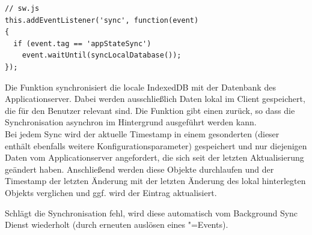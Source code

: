\begin{lstlisting}[caption={\code{sync}"=EventListener in der Service Worker Konfigurationsdatei},label={lst_realisierung_sw-background-sync}, frame=single]
// sw.js
this.addEventListener('sync', function(event) 
{
  if (event.tag == 'appStateSync') 
    event.waitUntil(syncLocalDatabase());
});
\end{lstlisting}

Die Funktion  synchronisiert die locale IndexedDB mit der Datenbank des Applicationserver. Dabei werden ausschließlich Daten lokal im Client gespeichert, die für den Benutzer relevant sind. Die Funktion gibt einen  zurück, so dass die Synchronisation asynchron im Hintergrund ausgeführt werden kann. \\
Bei jedem Sync wird der aktuelle Timestamp in einem gesonderten  (dieser enthält ebenfalls weitere Konfigurationsparameter) gespeichert und nur diejenigen Daten vom Applicationserver angefordert, die sich seit der letzten Aktualisierung geändert haben. Anschließend werden diese Objekte durchlaufen und der Timestamp der letzten Änderung mit der letzten Änderung des lokal hinterlegten Objekts verglichen und ggf. wird der Eintrag aktualisiert.

Schlägt die Synchronisation fehl, wird diese automatisch vom Background Sync Dienst wiederholt (durch erneuten auslösen eines "=Events).